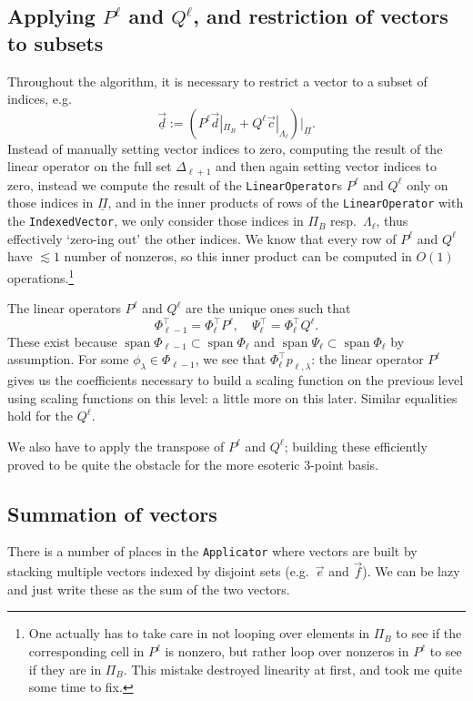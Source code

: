 \documentclass[11pt,a4paper]{amsart}
\theoremstyle{definition}
\DeclareMathOperator{\spann}{span}
\renewcommand{\span}{\spann}
\begin{document}
\subsection{Applying $P^\ell$ and $Q^\ell$, and restriction of vectors to subsets}
Throughout the algorithm, it is necessary to restrict a vector to a subset of
indices, e.g.
\[
  \underline{\vec d} := (P^\ell \vec d|_{\Pi_B} + Q^\ell \vec c|_{\Lambda_\ell})|_{\underline \Pi}.
\]
Instead of manually setting vector indices to zero, computing the result of the
linear operator on the full set $\Delta_{\ell + 1}$ and then again setting vector
indices to zero, instead we compute the result of the \texttt{LinearOperator}s
$P^\ell$ and $Q^\ell$ only on those indices in $\underline \Pi$, and in the inner
products of rows of the \texttt{LinearOperator} with the \texttt{IndexedVector},
we only consider those indices in $\Pi_B$ resp.~$\Lambda_\ell$, thus effectively
`zero-ing out' the other indices. We know that every
row of $P^\ell$ and $Q^\ell$ have $\lesssim 1$ number of nonzeros, so this inner
product can be computed in $O(1)$ operations.\footnote{One actually has to take
care in not looping over elements in $\Pi_B$ to see if the corresponding cell in
$P^\ell$ is nonzero, but rather loop over nonzeros in $P^\ell$ to see if they
are in $\Pi_B$. This mistake destroyed linearity at first, and took me quite some
time to fix.}

The linear operators $P^\ell$ and $Q^\ell$ are the unique ones such that
\[
  \Phi_{\ell-1}^\top = \Phi_\ell^\top P^\ell, \quad \Psi_\ell^\top = \Phi_\ell^\top Q^\ell.
\]
These exist because $\span \Phi_{\ell-1} \subset \span \Phi_\ell$ and
$\span \Psi_\ell \subset \span \Phi_\ell$ by assumption. For some $\phi_\lambda \in \Phi_{\ell-1}$,
we see that $\Phi_\ell^\top p_{\ell,\lambda}$: the linear operator $P^\ell$ gives us the
coefficients necessary to build a scaling function on the previous level using
scaling functions on this level: a little more on this later. Similar equalities
hold for the $Q^\ell$.

We also have to apply the transpose of $P^\ell$ and $Q^\ell$; building these
efficiently proved to be quite the obstacle for the more esoteric 3-point basis.

\subsection{Summation of vectors}
There is a number of places in the \texttt{Applicator} where vectors are built
by stacking multiple vectors indexed by disjoint sets (e.g.~$\vec e$ and $\vec f$).
We can be lazy and just write these as the sum of the two vectors.
\end{document}
